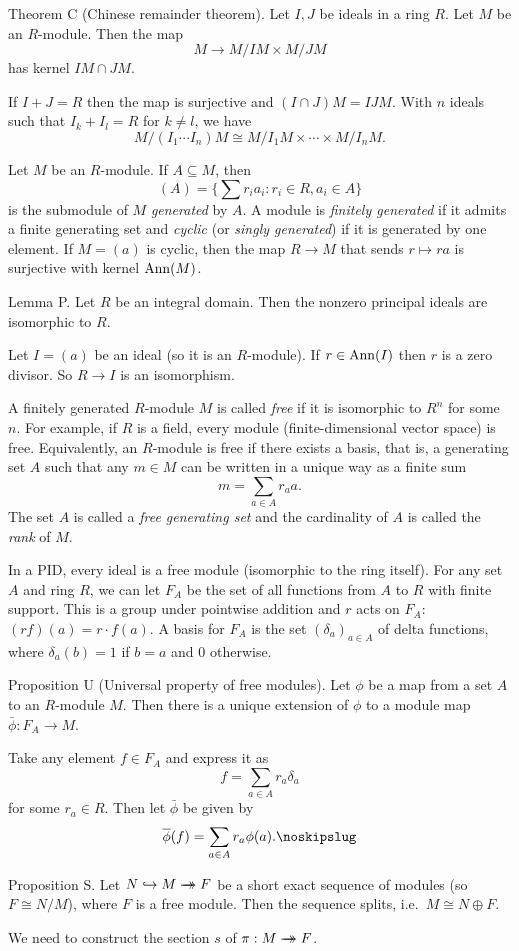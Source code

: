 \parenproclaim Theorem C (Chinese remainder theorem). Let $I,J$ be ideals in a ring $R$. Let $M$ be an $R$-module. Then the map
$$M\to M/IM \times M/JM$$
has kernel $IM\cap JM$.\slug

If $I+J = R$ then the map is surjective and $(I\cap J)M = IJM$. With $n$ ideals such that $I_k + I_l = R$ for $k\neq l$, we have
$$M/(I_1\cdots I_n)M \cong M/I_1M \times \cdots \times M/I_nM.$$

Let $M$ be an $R$-module. If $A\subseteq M$, then
$$(A) = \Big\{\sum r_ia_i : r_i\in R, a_i \in A\Big\}$$
is the submodule of $M$ {\it generated} by $A$. A module is {\it finitely generated} if it admits a finite generating set and {\it cyclic} (or {\it singly generated}) if it is generated by one element. If $M = (a)$ is cyclic, then the map $R\to M$ that sends $r\mapsto ra$ is surjective with kernel $\mathop {\rm Ann}(M)$.

\proclaim Lemma P. Let $R$ be an integral domain. Then the nonzero principal ideals are isomorphic to $R$.

\proof Let $I = (a)$ be an ideal (so it is an $R$-module). If $r\in \mathop {\rm Ann}(I)$ then $r$ is a zero divisor. So $R\to I$ is an isomorphism.\slug

A finitely generated $R$-module $M$ is called {\it free} if it is isomorphic to $R^n$ for some $n$. For example, if $R$ is a field, every module (finite-dimensional vector space) is free. Equivalently, an $R$-module is free if there exists a basis, that is, a generating set $A$ such that any $m\in M$ can be written in a unique way as a finite sum
$$m = \sum_{a\in A} r_a a.$$
The set $A$ is called a {\it free generating set} and the cardinality of $A$ is called the {\it rank} of $M$.

In a PID, every ideal is a free module (isomorphic to the ring itself). For any set $A$ and ring $R$, we can let $F_A$ be the set of all functions from $A$ to $R$ with finite support. This is a group under pointwise addition and $r$ acts on $F_A$: $(rf)(a) = r\cdot f(a)$. A basis for $F_A$ is the set $(\delta_a)_{a\in A}$ of delta functions, where $\delta_a(b) = 1$ if $b=a$ and $0$ otherwise.

\parenproclaim Proposition U (Universal property of free modules). Let $\phi$ be a map from a set $A$ to an $R$-module $M$. Then there is a unique extension of $\phi$ to a module map $\bar\phi : F_A\to M$.

\proof Take any element $f\in F_A$ and express it as
$$f = \sum_{a\in A} r_a\delta_a$$
for some $r_a\in R$. Then let $\bar\phi$ be given by
$$\bar\phi(f) = \sum_{a\in A} r_a\phi(a).\noskipslug$$

\proclaim Proposition S. Let $N\hookrightarrow M \rightarrow\!\!\!\!\!\rightarrow F$ be a short exact sequence of modules (so $F \cong N/M$), where $F$ is a free module. Then the sequence splits, i.e.\ $M\cong N\oplus F$.

\proof We need to construct the section $s$ of $\pi : M\rightarrow\!\!\!\!\!\rightarrow F$.

\bye
